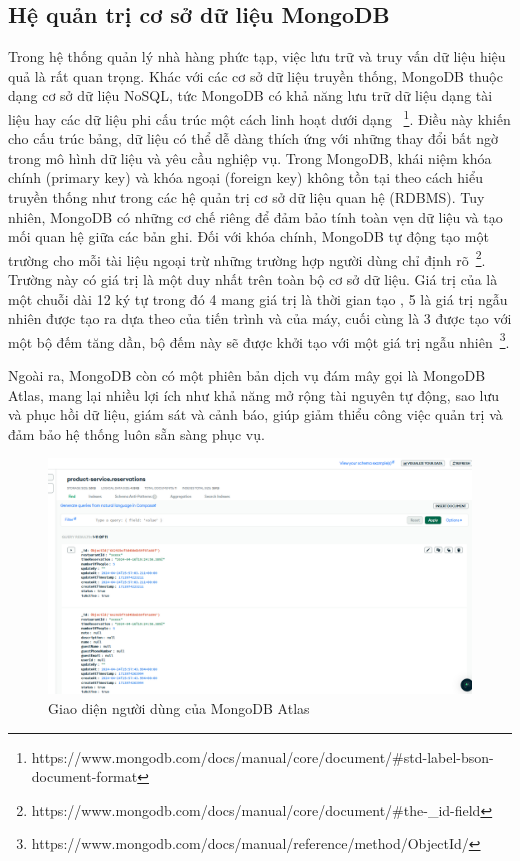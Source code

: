 \subsection{Hệ quản trị cơ sở dữ liệu MongoDB}
Trong hệ thống quản lý nhà hàng phức tạp, việc lưu trữ và truy vấn dữ liệu hiệu quả là rất quan trọng.
Khác với các cơ sở dữ liệu truyền thống, MongoDB thuộc dạng cơ sở dữ liệu NoSQL, tức MongoDB có khả năng lưu trữ dữ liệu dạng tài liệu hay các dữ liệu phi cấu trúc một cách linh hoạt dưới dạng ~\footnote{https://www.mongodb.com/docs/manual/core/document/\#std-label-bson-document-format}. Điều này khiến cho cấu trúc bảng, dữ liệu có thể dễ dàng thích ứng với những thay đổi bất ngờ trong mô hình dữ liệu và yêu cầu nghiệp vụ.
Trong MongoDB, khái niệm khóa chính (primary key) và khóa ngoại (foreign key) không tồn tại theo cách hiểu truyền thống như trong các hệ quản trị cơ sở dữ liệu quan hệ (RDBMS). Tuy nhiên, MongoDB có những cơ chế riêng để đảm bảo tính toàn vẹn dữ liệu và tạo mối quan hệ giữa các bản ghi.
Đối với khóa chính, MongoDB tự động tạo một trường  cho mỗi tài liệu ngoại trừ những trường hợp người dùng chỉ định rõ~\footnote{https://www.mongodb.com/docs/manual/core/document/\#the-\_id-field}.
Trường này có giá trị là một  duy nhất trên toàn bộ cơ sở dữ liệu.
Giá trị của  là một chuỗi  dài 12 ký tự trong đó 4  mang giá trị là thời gian tạo , 5  là giá trị ngẫu nhiên được tạo ra dựa theo  của tiến trình và của máy, cuối cùng là 3  được tạo với một bộ đếm tăng dần, bộ đếm này sẽ được khởi tạo với một giá trị ngẫu nhiên~\footnote{https://www.mongodb.com/docs/manual/reference/method/ObjectId/}.

Ngoài ra, MongoDB còn có một phiên bản dịch vụ đám mây gọi là MongoDB Atlas, mang lại nhiều lợi ích như khả năng mở rộng tài nguyên tự động, sao lưu và phục hồi dữ liệu, giám sát và cảnh báo, giúp giảm thiểu công việc quản trị và đảm bảo hệ thống luôn sẵn sàng phục vụ.

\begin{figure}[h]
	\centering
	\includegraphics[width=\textwidth]{images/hChip/MongoDB/mongodb-preview.png}
	\caption{Giao diện người dùng của MongoDB Atlas}
	\label{fig:mongoDB-preview}
\end{figure}

